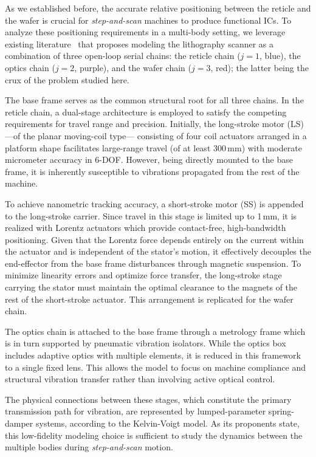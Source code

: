 As we established before, the accurate relative positioning between the reticle and the wafer is crucial for \textit{step-and-scan} machines to produce functional ICs. To analyze these positioning requirements in a multi-body setting, we leverage existing literature~\cite{Al-Rawashdeh2022_Caracterization} that proposes modeling the lithography scanner as a combination of three open-loop serial chains: the reticle chain ($j=1$, blue), the optics chain ($j=2$, purple), and the wafer chain ($j=3$, red); the latter being the crux of the problem studied here.

The base frame serves as the common structural root for all three chains. In the reticle chain, a dual-stage architecture is employed to satisfy the competing requirements for travel range and precision. Initially, the long-stroke motor (LS) ---of the planar moving-coil type\cite{tissingh2023improving}--- consisting of four coil actuators arranged in a platform shape facilitates large-range travel (of at least 300\,mm) with moderate micrometer accuracy in 6-DOF. However, being directly mounted to the base frame, it is inherently susceptible to vibrations propagated from the rest of the machine.

To achieve nanometric tracking accuracy, a short-stroke motor (SS) is appended to the long-stroke carrier. Since travel in this stage is limited up to 1\,mm, it is realized with Lorentz actuators which provide contact-free, high-bandwidth positioning. Given that the Lorentz force depends entirely on the current within the actuator and is independent of the stator's motion, it effectively decouples the end-effector from the base frame disturbances through magnetic suspension\cite{Butler2011_PositionControl}. To minimize linearity errors and optimize force transfer, the long-stroke stage carrying the stator must maintain the optimal clearance to the magnets of the rest of the short-stroke actuator. This arrangement is replicated for the wafer chain.

The optics chain is attached to the base frame through a metrology frame which is in turn supported by pneumatic vibration isolators\cite{Butler2011_PositionControl}. While the optics box includes adaptive optics with multiple elements, it is reduced in this framework to a single fixed lens. This allows the model to focus on machine compliance and structural vibration transfer rather than involving active optical control\cite{Al-Rawashdeh2022_Caracterization}.

The physical connections between these stages, which constitute the primary transmission path for vibration, are represented by lumped-parameter spring-damper systems, according to the Kelvin-Voigt model. As its proponents state, this low-fidelity modeling choice is sufficient to study the dynamics between the multiple bodies during \textit{step-and-scan} motion\cite{Al-Rawashdeh2022_Caracterization}.

